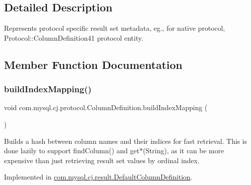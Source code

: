 \subsection{Detailed Description}
Represents protocol specific result set metadata, eg., for native protocol, Protocol\+::\+Column\+Definition41 protocol entity. 

\subsection{Member Function Documentation}
\mbox{\label{interfacecom_1_1mysql_1_1cj_1_1protocol_1_1_column_definition_abadc6af9b7111fa0398649fe01a43308}} 
\subsubsection{\texorpdfstring{build\+Index\+Mapping()}{buildIndexMapping()}}
{\footnotesize\ttfamily void com.\+mysql.\+cj.\+protocol.\+Column\+Definition.\+build\+Index\+Mapping (\begin{DoxyParamCaption}{ }\end{DoxyParamCaption})}

Builds a hash between column names and their indices for fast retrieval. This is done lazily to support find\+Column() and get$\ast$(String), as it can be more expensive than just retrieving result set values by ordinal index. 

Implemented in \mbox{\hyperlink{classcom_1_1mysql_1_1cj_1_1result_1_1_default_column_definition_a765750a709687a3a53d1fe1fa9891c96}{com.\+mysql.\+cj.\+result.\+Default\+Column\+Definition}}.

\mbox{\label{interfacecom_1_1mysql_1_1cj_1_1protocol_1_1_column_definition_adc02edd67e54d79c7f91d41d027e44ae}} 

